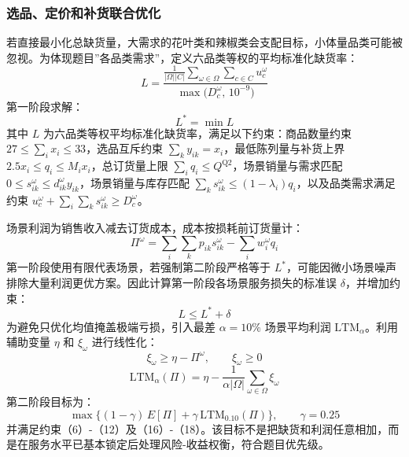 \documentclass[withoutpreface,bwprint]{cumcmthesis} %
\numberwithin{equation}{section}
\begin{document}
\subsubsection{选品、定价和补货联合优化}

若直接最小化总缺货量，大需求的花叶类和辣椒类会支配目标，小体量品类可能被忽视。为体现题目''各品类需求''，定义六品类等权的平均标准化缺货率：
\begin{equation}
    L = \frac{\frac{1}{|\Omega||C|}\sum_{\omega\in\Omega}\sum_{c\in C} u_c^{\omega}}{\max\bigl(D_c^{\omega},\,10^{-9}\bigr)}
\end{equation}
第一阶段求解：
\begin{equation}
    L^* = \min L
\end{equation}
其中 $L$ 为六品类等权平均标准化缺货率，满足以下约束：商品数量约束 $27\leq\sum_i x_i\leq 33$，选品互斥约束 $\sum_k y_{ik}=x_i$，最低陈列量与补货上界 $2.5x_i\leq q_i\leq M_i x_i$，总订货量上限 $\sum_i q_i\leq Q^{\mathrm{Q2}}$，场景销量与需求匹配 $0\leq s_{ik}^\omega\leq d_{ik}^\omega y_{ik}$，场景销量与库存匹配 $\sum_k s_{ik}^\omega\leq (1-\lambda_i)q_i$，以及品类需求满足约束 $u_c^\omega+\sum_i\sum_k s_{ik}^\omega\geq D_c^\omega$。

场景利润为销售收入减去订货成本，成本按损耗前订货量计：
\begin{equation}
    \Pi^{\omega} = \sum_i\sum_k p_{ik} s_{ik}^{\omega} - \sum_i w_i^{\omega} q_i
\end{equation}
第一阶段使用有限代表场景，若强制第二阶段严格等于 $L^*$，可能因微小场景噪声排除大量利润更优方案。因此计算第一阶段各场景服务损失的标准误 $\delta$，并增加约束：
\begin{equation}
    L \leq L^* + \delta
\end{equation}
为避免只优化均值掩盖极端亏损，引入最差 $\alpha=10\%$ 场景平均利润 $\mathrm{LTM}_{\alpha}$。利用辅助变量 $\eta$ 和 $\xi_{\omega}$ 进行线性化：
\begin{equation}
    \xi_{\omega} \geq \eta - \Pi^{\omega},\qquad \xi_{\omega} \geq 0
\end{equation}
\begin{equation}
    \mathrm{LTM}_{\alpha}(\Pi) = \eta - \frac{1}{\alpha|\Omega|}\sum_{\omega\in\Omega}\xi_{\omega}
\end{equation}
第二阶段目标为：
\begin{equation}
    \max\bigl\{(1-\gamma)\,{E}[\Pi] + \gamma\,\mathrm{LTM}_{0.10}(\Pi)\bigr\},\qquad \gamma = 0.25
\end{equation}
并满足约束（6）-（12）及（16）-（18）。该目标不是把缺货和利润任意相加，而是在服务水平已基本锁定后处理风险-收益权衡，符合题目优先级。
\end{document}
